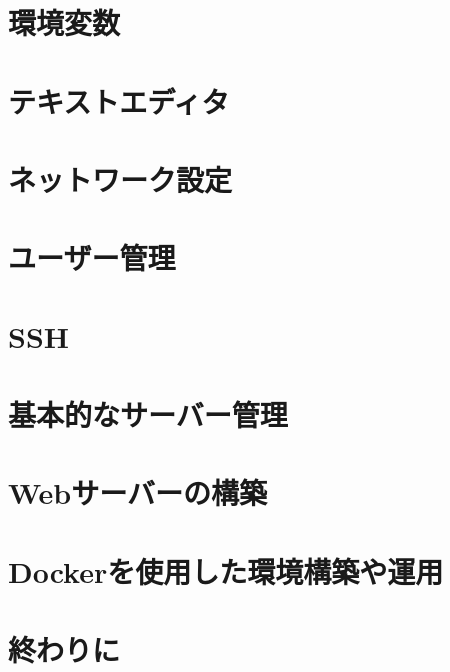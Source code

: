 \documentclass[a4paper, 11pt, dvipdfmx]{jsarticle}
\begin{document}
\section{環境変数}

\section{テキストエディタ}

\section{ネットワーク設定}

\section{ユーザー管理}

\section{SSH}

\section{基本的なサーバー管理}

\section{Webサーバーの構築}

\section{Dockerを使用した環境構築や運用}

\section{終わりに}
\end{document}
